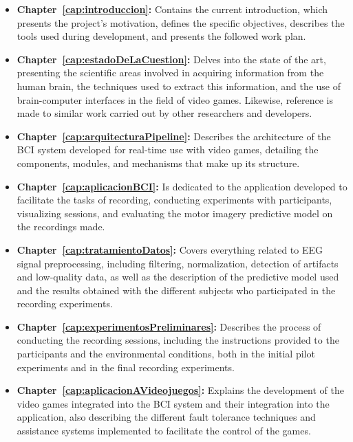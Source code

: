 \begin{itemize}
    \item \textbf{Chapter~\ref{cap:introduccion}:} Contains the current introduction, which 
    presents the project's motivation, defines the specific objectives, 
    describes the tools used during development, and presents the 
    followed work plan.

    \item \textbf{Chapter~\ref{cap:estadoDeLaCuestion}:} Delves into the state of the art, 
    presenting the scientific areas involved in acquiring information 
    from the human brain, the techniques used to extract this information, 
    and the use of brain-computer interfaces in the field of video games. 
    Likewise, reference is made to similar work carried out by other 
    researchers and developers.

    \item \textbf{Chapter~\ref{cap:arquitecturaPipeline}:} Describes the architecture of the BCI system 
    developed for real-time use with video games, detailing the 
    components, modules, and mechanisms that make up its structure.

    \item \textbf{Chapter~\ref{cap:aplicacionBCI}:} Is dedicated to the application developed to 
    facilitate the tasks of recording, conducting experiments with 
    participants, visualizing sessions, and evaluating the motor imagery 
    predictive model on the recordings made.

    \item \textbf{Chapter~\ref{cap:tratamientoDatos}:} Covers everything related to EEG signal 
    preprocessing, including filtering, normalization, detection of 
    artifacts and low-quality data, as well as the description of the 
    predictive model used and the results obtained with the different 
    subjects who participated in the recording experiments.

    \item \textbf{Chapter~\ref{cap:experimentosPreliminares}:} Describes the process of conducting the 
    recording sessions, including the instructions provided to the 
    participants and the environmental conditions, both in the initial 
    pilot experiments and in the final recording experiments.

    \item \textbf{Chapter~\ref{cap:aplicacionAVideojuegos}:} Explains the development of the video games 
    integrated into the BCI system and their integration into the 
    application, also describing the different fault tolerance techniques 
    and assistance systems implemented to facilitate the control of the games.


\end{itemize}
